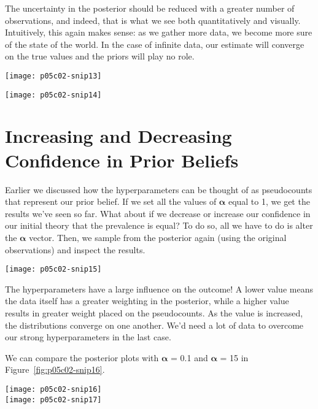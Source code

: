 The uncertainty in the posterior should be reduced with a greater number of observations, and indeed, that is what we see both quantitatively and visually. Intuitively, this again makes sense: as we gather more data, we become more sure of the state of the world. In the case of infinite data, our estimate will converge on the true values and the priors will play no role.

\begin{figure*}[h]
    \texttt{[image: p05c02-snip13]}
\end{figure*}
\begin{figure*}[h]
    \texttt{[image: p05c02-snip14]}
    \caption{Posteriors with more data}
\end{figure*}


\section{Increasing and Decreasing Confidence in Prior Beliefs}

Earlier we discussed how the hyperparameters can be thought of as pseudocounts that represent our prior belief. If we set all the values of $\bm \alpha$ equal to 1, we get the results we've seen so far. What about if we decrease or increase our confidence in our initial theory that the prevalence is equal? To do so, all we have to do is alter the $\boldsymbol {\alpha }$ vector. Then, we sample from the posterior again (using the original observations) and inspect the results.

\begin{figure*}[h]
    \texttt{[image: p05c02-snip15]}
\end{figure*}



The hyperparameters have a large influence on the outcome! A lower value means the data itself has a greater weighting in the posterior, while a higher value results in greater weight placed on the pseudocounts. As the value is increased, the distributions converge on one another. We'd need a lot of data to overcome our strong hyperparameters in the last case.

We can compare the posterior plots with $\bm \alpha$ = 0.1 and $\bm \alpha$ = 15 in Figure~\ref{fig:p05c02-snip16}.


\begin{figure*}[h]
    \texttt{[image: p05c02-snip16]}\\
    \texttt{[image: p05c02-snip17]}
    \caption{Posterior plots with different $\bm \alpha$ }
    \label{fig:p05c02-snip16}
\end{figure*}


